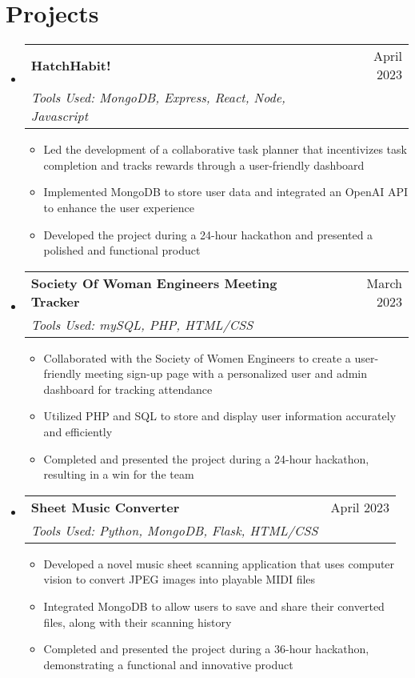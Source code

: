 \documentclass[letterpaper,11pt]{article}
\makeatletter
\newcommand{\resumeSubheading}[4]{
  \vspace{-1pt}\item
    \begin{tabular*}{0.97\textwidth}[t]{l@{\extracolsep{\fill}}r}
      \textbf{#1} & #2 \\
      \textit{\small#3} & \textit{\small #4} \\
    \end{tabular*}\vspace{-5pt}
}
\newcommand{\resumeSubHeadingListStart}{\begin{itemize}[leftmargin=*]}
\newcommand{\resumeSubHeadingListEnd}{\end{itemize}}
\makeatother
\begin{document}
\section{Projects}
  \resumeSubHeadingListStart
    \resumeSubheading
      {HatchHabit!}{April 2023}
      {Tools Used: MongoDB, Express, React, Node, Javascript}{}
        {\begin{itemize}
        \item Led the development of a collaborative task planner that incentivizes task completion and tracks rewards through a user-friendly dashboard
\item Implemented MongoDB to store user data and integrated an OpenAI API to enhance the user experience
\item Developed the project during a 24-hour hackathon and presented a polished and functional product
      \end{itemize}
      }
    \resumeSubheading
      {Society Of Woman Engineers Meeting Tracker}{March 2023}
      {Tools Used: mySQL, PHP, HTML/CSS}{}
      {\begin{itemize}
\item Collaborated with the Society of Women Engineers to create a user-friendly meeting sign-up page with a personalized user and admin dashboard for tracking attendance
\item Utilized PHP and SQL to store and display user information accurately and efficiently
\item Completed and presented the project during a 24-hour hackathon, resulting in a win for the team
      \end{itemize}
      }

    
    \resumeSubheading
      {Sheet Music Converter}{April 2023}
      {Tools Used: Python, MongoDB, Flask, HTML/CSS}{}
      {\begin{itemize}
\item Developed a novel music sheet scanning application that uses computer vision to convert JPEG images into playable MIDI files
    \item Integrated MongoDB to allow users to save and share their converted files, along with their scanning history
    \item Completed and presented the project during a 36-hour hackathon, demonstrating a functional and innovative product
      \end{itemize}
      }
  \resumeSubHeadingListEnd

\end{document}
